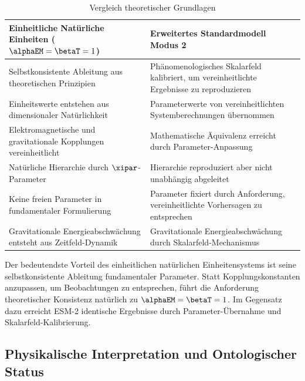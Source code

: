 	\begin{table}[ht]
		\centering
		\caption{Vergleich theoretischer Grundlagen}
		\label{tab:theoretical_foundations}
		\begin{tabular}{p{}|p{}}
			\hline
			\textbf{Einheitliche Natürliche Einheiten ($\alphaEM = \betaT = 1$)} & \textbf{Erweitertes Standardmodell Modus 2} \\
			\hline
			Selbstkonsistente Ableitung aus theoretischen Prinzipien & Phänomenologisches Skalarfeld kalibriert, um vereinheitlichte Ergebnisse zu reproduzieren \\
			\hline
			Einheitswerte entstehen aus dimensionaler Natürlichkeit & Parameterwerte von vereinheitlichten Systemberechnungen übernommen \\
			\hline
			Elektromagnetische und gravitationale Kopplungen vereinheitlicht & Mathematische Äquivalenz erreicht durch Parameter-Anpassung \\
			\hline
			Natürliche Hierarchie durch $\xipar$-Parameter & Hierarchie reproduziert aber nicht unabhängig abgeleitet \\
			\hline
			Keine freien Parameter in fundamentaler Formulierung & Parameter fixiert durch Anforderung, vereinheitlichte Vorhersagen zu entsprechen \\
			\hline
			Gravitationale Energieabschwächung entsteht aus Zeitfeld-Dynamik & Gravitationale Energieabschwächung durch Skalarfeld-Mechanismus \\
			\hline
		\end{tabular}
	\end{table}
	
	Der bedeutendste Vorteil des einheitlichen natürlichen Einheitensystems ist seine selbstkonsistente Ableitung fundamentaler Parameter. Statt Kopplungskonstanten anzupassen, um Beobachtungen zu entsprechen, führt die Anforderung theoretischer Konsistenz natürlich zu $\alphaEM = \betaT = 1$. Im Gegensatz dazu erreicht ESM-2 identische Ergebnisse durch Parameter-Übernahme und Skalarfeld-Kalibrierung.
	
	\subsection{Physikalische Interpretation und Ontologischer Status}
	\label{subsec:physical_interpretation_ontological}
	
